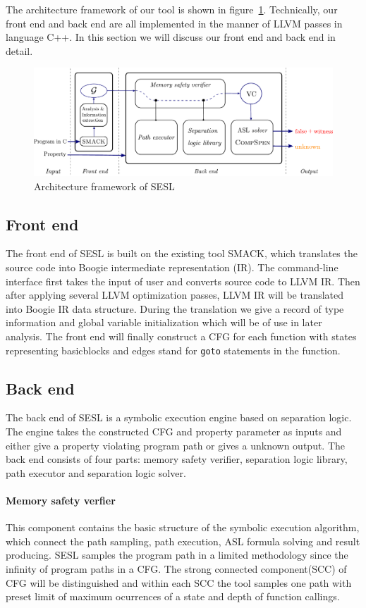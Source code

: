 \documentclass[runningheads]{llncs}
\begin{document}
The architecture framework of our tool is shown in figure~\ref{fig1}. Technically, our front end and back end are all implemented in the manner of LLVM passes in language C++. In this section we will discuss our front end and back end in detail.  

\begin{figure}
\includegraphics[width=\textwidth]{svcomp.pdf}
\caption{Architecture framework of \textsc{SESL}} \label{fig1}
\end{figure}

\subsection{Front end} The front end of \textsc{SESL} is built on the existing tool \textsc{SMACK}, which translates the source code into Boogie intermediate representation (IR). The command-line interface first takes the input of user and converts source code to LLVM IR. 
Then after applying several LLVM optimization passes, LLVM IR will be translated into Boogie IR data structure.
During the translation we give a record of type information and global variable initialization which will be of use in later analysis. 
The front end will finally construct a CFG for each function with states representing basicblocks and edges stand for \texttt{goto} statements in the function. 



\subsection{Back end}
The back end of \textsc{SESL} is a symbolic execution engine based on separation logic. The engine takes the constructed CFG and property parameter as inputs and either give a property violating program path or gives a unknown output. The back end consists of four parts: memory safety verifier, separation logic library, path executor and separation logic solver.




\paragraph{Memory safety verfier} This component contains the basic structure of the symbolic execution algorithm, which connect the path sampling, path execution, ASL formula solving and result producing. \textsc{SESL} samples the program path in a limited methodology since the infinity of program paths in a CFG. The strong connected component(SCC) of CFG will be distinguished and within each SCC the tool samples one path with preset limit of maximum ocurrences of a state and depth of function callings.
\end{document}
